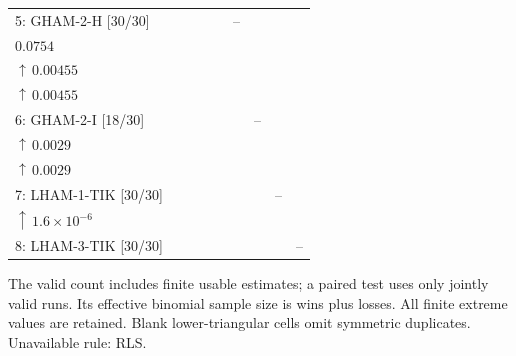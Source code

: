 \begin{table}[!htbp]
{\begin{tabular}{@{}l*{8}{c}@{}}
5: GHAM-2-H [30/30] &  &  &  &  & -- & \shortstack{$15{:}3{:}0$\\$0.0754$} & \shortstack{$25{:}5{:}0$\\$\uparrow\,0.00455$} & \shortstack{$25{:}5{:}0$\\$\uparrow\,0.00455$} \\
6: GHAM-2-I [18/30] &  &  &  &  &  & -- & \shortstack{$17{:}1{:}0$\\$\uparrow\,0.0029$} & \shortstack{$17{:}1{:}0$\\$\uparrow\,0.0029$} \\
7: LHAM-1-TIK [30/30] &  &  &  &  &  &  & -- & \shortstack{$29{:}1{:}0$\\$\uparrow\,1.6\!\times\!10^{-6}$} \\
8: LHAM-3-TIK [30/30] &  &  &  &  &  &  &  & -- \\
\bottomrule
\end{tabular}%
}
\endgroup
\par\smallskip
\begin{minipage}{\linewidth}\footnotesize
The valid count includes finite usable estimates; a paired test uses only jointly valid runs. Its effective binomial sample size is wins plus losses. All finite extreme values are retained. Blank lower-triangular cells omit symmetric duplicates.
Unavailable rule: RLS.
\end{minipage}
\end{table}

